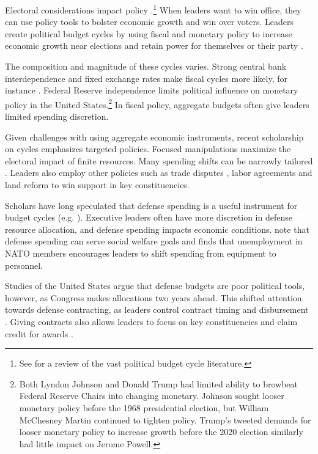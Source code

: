 \documentclass[12pt]{article}
\begin{document}
Electoral considerations impact policy \citep{Nordhaus1975}.\footnote{See \citet{Dubois2016} for a review of the vast political budget cycle literature.} 
When leaders want to win office, they can use policy tools to bolster economic growth and win over voters. 
Leaders create political budget cycles by using fiscal and monetary policy to increase economic growth near elections and retain power for themselves or their party \citep{Tufte1978, Rogoff1987}. 


The composition and magnitude of these cycles varies. 
Strong central bank interdependence and fixed exchange rates make fiscal cycles more likely, for instance \citep{ClarkHallerberg2000}. 
Federal Reserve independence limits political influence on monetary policy in the United States.\footnote{Both Lyndon Johnson and Donald Trump had limited ability to browbeat Federal Reserve Chairs into changing monetary. 
Johnson sought looser monetary policy before the 1968 presidential election, but William McChesney Martin continued to tighten policy.
Trump's tweeted demands for looser monetary policy to increase growth before the 2020 election similarly had little impact on Jerome Powell.}
In fiscal policy, aggregate budgets often give leaders limited spending discretion.


Given challenges with using aggregate economic instruments, recent scholarship on cycles emphasizes targeted policies.
Focused manipulations maximize the electoral impact of finite resources.
Many spending shifts can be narrowly tailored \citep[pg. 248]{Dubois2016}.
Leaders also employ other policies such as trade disputes \citep{Conconietal2017}, labor agreements \citep{Ahlquist2010} and land reform \citep{Philips2020} to win support in key constituencies.


Scholars have long speculated that defense spending is a useful instrument for budget cycles (e.g. \cite{Tufte1978, Mintz1988}).
Executive leaders often have more discretion in defense resource allocation, and defense spending impacts economic conditions.
\citet{WhittenWilliams2011} note that defense spending can serve social welfare goals and \citet{Becker2021} finds that unemployment in NATO members encourages leaders to shift spending from equipment to personnel.


Studies of the United States argue that defense budgets are poor political tools, however, as Congress makes allocations two years ahead.
This shifted attention towards defense contracting, as leaders control contract timing and disbursement \citep{Mayer1995, DerouenHeo2000}.
Giving contracts also allows leaders to focus on key constituencies and claim credit for awards \citep{DerouenHeo2000}. 
\end{document}
